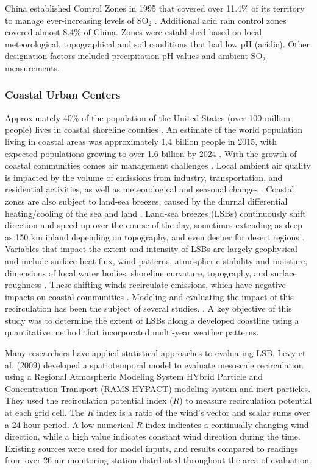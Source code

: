 China established Control Zones in 1995 that covered over 11.4\% of its territory to manage ever-increasing levels of SO$_{2}$ \citep{Hao2000}.  Additional acid rain control zones covered almost 8.4\% of China.  Zones were established based on local meteorological, topographical and soil conditions that had low pH (acidic).  Other designation factors included precipitation pH values and ambient SO$_{2}$ measurements.

\subsubsection{Coastal Urban Centers}

Approximately 40\% of the population of the United States (over 100 million people) lives in coastal shoreline counties \citep{NOAA2013}.  An estimate of the world population living in coastal areas was approximately 1.4 billion people in 2015, with expected populations growing to over 1.6 billion by 2024 \citep{Geohive2015}.  With the growth of coastal communities comes air management challenges \citep{Gamas2015}.  Local ambient air quality is impacted by the volume of emissions from industry, transportation, and residential activities, as well as meteorological and seasonal changes \citep{Fiore2015, Kimbrough2013}.  Coastal zones are also subject to land-sea breezes, caused by the diurnal differential heating/cooling of the sea and land \citep{Crosman2010, Cuxart2014, Tsai2011}.  Land-sea breezes (LSBs) continuously shift direction and speed up over the course of the day, sometimes extending as deep as 150 km inland depending on topography, and even deeper for desert regions \citep{Miao2015, Zhu2004}.  Variables that impact the extent and intensity of LSBs are largely geophysical and include surface heat flux, wind patterns, atmospheric stability and moisture, dimensions of local water bodies, shoreline curvature, topography, and surface roughness \citep{Crosman2010, Lu1995}.  These shifting winds recirculate emissions, which have negative impacts on coastal communities \citep{Lu1996}.  Modeling and evaluating the impact of this recirculation has been the subject of several studies. \citep{Crosman2010, Levy2009, Wu2013, Zhu2004}.  A key objective of this study was to determine the extent of LSBs along a developed coastline using a quantitative method that incorporated multi-year weather patterns. 

Many researchers have applied statistical approaches to evaluating LSB.  Levy et al. (2009) developed a spatiotemporal model to evaluate mesoscale recirculation using a Regional Atmospheric Modeling System HYbrid Particle and Concentration Transport (RAMS-HYPACT) modeling system and inert particles.  They used the recirculation potential index ($R$) to measure recirculation potential at each grid cell.  The $R$ index is a ratio of the wind’s vector and scalar sums over a 24 hour period.  A low numerical $R$ index indicates a continually changing wind direction, while a high value indicates constant wind direction during the time.  Existing sources were used for model inputs, and results compared to readings from over 26 air monitoring station distributed throughout the area of evaluation.  

